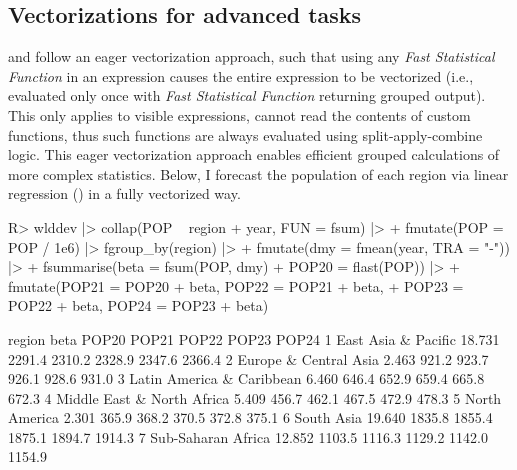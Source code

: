 \documentclass[article]{jss} %
\newcommand{\fct}[1]{\code{#1()}}
\begin{document}
\subsection{Vectorizations for advanced tasks} \label{ssec:vfat}
%
\fct{fsummarise} and \fct{fmutate} follow an eager vectorization approach, such that using any \emph{Fast Statistical Function} in an expression causes the entire expression to be vectorized (i.e., evaluated only once with \emph{Fast Statistical Function} returning grouped output). This only applies to visible expressions,  cannot read the contents of custom functions, thus such functions are always evaluated using split-apply-combine logic. This eager vectorization approach enables efficient grouped calculations of more complex statistics. Below, I forecast the population of each region via linear regression () in a fully vectorized way.
%
\begin{Schunk}
\begin{Sinput}
R> wlddev |> collap(POP ~ region + year, FUN = fsum) |>
+    fmutate(POP = POP / 1e6) |> fgroup_by(region) |>
+    fmutate(dmy = fmean(year, TRA = "-")) |>
+    fsummarise(beta = fsum(POP, dmy) %/=% fsum(dmy, dmy),
+               POP20 = flast(POP)) |>
+    fmutate(POP21 = POP20 + beta, POP22 = POP21 + beta,
+            POP23 = POP22 + beta, POP24 = POP23 + beta)
\end{Sinput}
\begin{Soutput}
                      region   beta  POP20  POP21  POP22  POP23  POP24
1        East Asia & Pacific 18.731 2291.4 2310.2 2328.9 2347.6 2366.4
2      Europe & Central Asia  2.463  921.2  923.7  926.1  928.6  931.0
3  Latin America & Caribbean  6.460  646.4  652.9  659.4  665.8  672.3
4 Middle East & North Africa  5.409  456.7  462.1  467.5  472.9  478.3
5              North America  2.301  365.9  368.2  370.5  372.8  375.1
6                 South Asia 19.640 1835.8 1855.4 1875.1 1894.7 1914.3
7         Sub-Saharan Africa 12.852 1103.5 1116.3 1129.2 1142.0 1154.9
\end{Soutput}
\end{Schunk}
%
\end{document}
